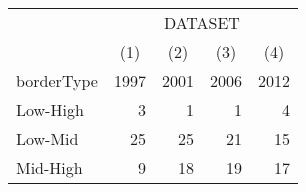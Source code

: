 \begin{center}
\begin{threeparttable}[!h]
\begin{tabular}{lrrrr}
\toprule
&\multicolumn{4}{c}{DATASET} \\
&\multicolumn{1}{c}{(1)}&\multicolumn{1}{c}{(2)}&\multicolumn{1}{c}{(3)}&\multicolumn{1}{c}{(4)}\\
borderType&\multicolumn{1}{c}{1997}&\multicolumn{1}{c}{2001}&\multicolumn{1}{c}{2006}&\multicolumn{1}{c}{2012}\\
\midrule
Low-High            &           3&           1&           1&           4\\
Low-Mid             &          25&          25&          21&          15\\
Mid-High            &           9&          18&          19&          17\\
\bottomrule
\bottomrule
\end{tabular}
\end{threeparttable}
\end{center}
